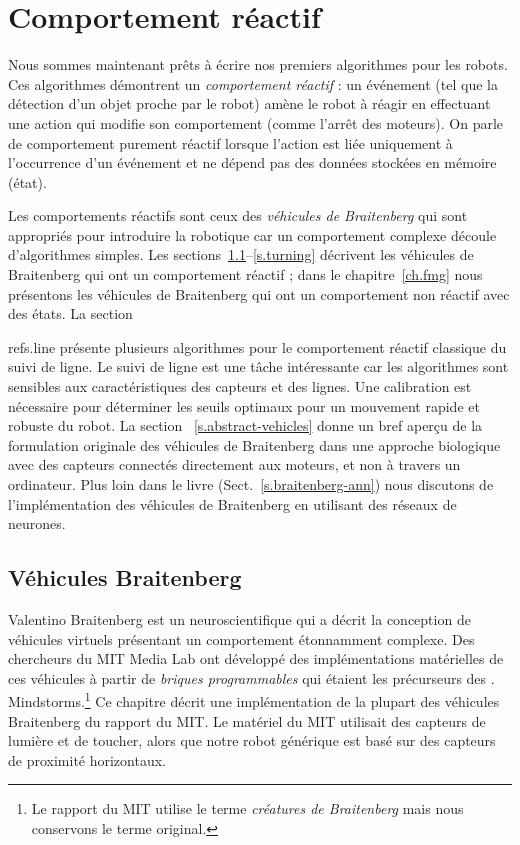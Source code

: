 

\chapter{Comportement réactif}\label{ch.reactive}

Nous sommes maintenant prêts à écrire nos premiers algorithmes pour les robots. Ces algorithmes démontrent un \emph{comportement réactif} : un événement (tel que la détection d'un objet proche par le robot) amène le robot à réagir en effectuant une action qui modifie son comportement (comme l'arrêt des moteurs). On parle de comportement purement réactif lorsque l'action est liée uniquement à l'occurrence d'un événement et ne dépend pas des données stockées en mémoire (état).

Les comportements réactifs sont ceux des \emph{véhicules de Braitenberg} qui sont appropriés pour introduire la robotique car un comportement complexe découle d'algorithmes simples. Les sections~\ref{s.braitenberg}--\ref{s.turning} décrivent les véhicules de Braitenberg qui ont un comportement réactif ; dans le chapitre~\ref{ch.fmg} nous présentons les véhicules de Braitenberg qui ont un comportement non réactif avec des états. La section~{ref{s.line} présente plusieurs algorithmes pour le comportement réactif classique du suivi de ligne. Le suivi de ligne est une tâche intéressante car les algorithmes sont sensibles aux caractéristiques des capteurs et des lignes. Une calibration est nécessaire pour déterminer les seuils optimaux pour un mouvement rapide et robuste du robot. La section ~\ref{s.abstract-vehicles} donne un bref aperçu de la formulation originale des véhicules de Braitenberg dans une approche biologique avec des capteurs connectés directement aux moteurs, et non à travers un ordinateur. Plus loin dans le livre (Sect.~\ref{s.braitenberg-ann}) nous discutons de l'implémentation des véhicules de Braitenberg en utilisant des réseaux de neurones.

\section{Véhicules Braitenberg}\label{s.braitenberg}

Valentino Braitenberg est un neuroscientifique qui a décrit la conception de véhicules virtuels présentant un comportement étonnamment complexe. Des chercheurs du MIT Media Lab ont développé des implémentations matérielles de ces véhicules à partir de \emph{briques programmables} qui étaient les précurseurs des \lego{}. Mindstorms.\footnote{Le rapport du MIT utilise le terme \emph{créatures de Braitenberg} mais nous conservons le terme original.} Ce chapitre décrit une implémentation de la plupart des véhicules Braitenberg du rapport du MIT. Le matériel du MIT utilisait des capteurs de lumière et de toucher, alors que notre robot générique est basé sur des capteurs de proximité horizontaux.

}
